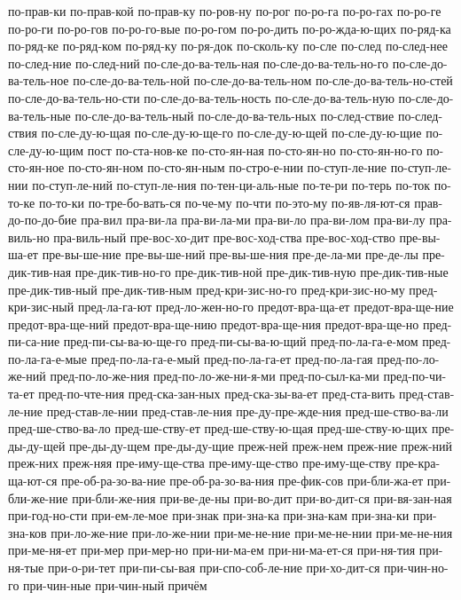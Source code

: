 {по-прав-ки
по-прав-кой
по-прав-ку
по-ров-ну
по-рог
по-ро-га
по-ро-гах
по-ро-ге
по-ро-ги
по-ро-гов
по-ро-го-вые
по-ро-гом
по-ро-дить
по-ро-жда-ю-щих
по-ряд-ка
по-ряд-ке
по-ряд-ком
по-ряд-ку
по-ря-док
по-сколь-ку
по-сле
по-след
по-след-нее
по-след-ние
по-след-ний
по-сле-до-ва-тель-ная
по-сле-до-ва-тель-но-го
по-сле-до-ва-тель-ное
по-сле-до-ва-тель-ной
по-сле-до-ва-тель-ном
по-сле-до-ва-тель-но-стей
по-сле-до-ва-тель-но-сти
по-сле-до-ва-тель-ность
по-сле-до-ва-тель-ную
по-сле-до-ва-тель-ные
по-сле-до-ва-тель-ный
по-сле-до-ва-тель-ных
по-след-ствие
по-след-ствия
по-сле-ду-ю-щая
по-сле-ду-ю-ще-го
по-сле-ду-ю-щей
по-сле-ду-ю-щие
по-сле-ду-ю-щим
пост
по-ста-нов-ке
по-сто-ян-ная
по-сто-ян-но
по-сто-ян-но-го
по-сто-ян-ное
по-сто-ян-ном
по-сто-ян-ным
по-стро-е-нии
по-ступ-ле-ние
по-ступ-ле-нии
по-ступ-ле-ний
по-ступ-ле-ния
по-тен-ци-аль-ные
по-те-ри
по-терь
по-ток
по-то-ке
по-то-ки
по-тре-бо-вать-ся
по-че-му
по-чти
по-это-му
по-яв-ля-ют-ся
прав-до-по-до-бие
пра-вил
пра-ви-ла
пра-ви-ла-ми
пра-ви-ло
пра-ви-лом
пра-ви-лу
пра-виль-но
пра-виль-ный
пре-вос-хо-дит
пре-вос-ход-ства
пре-вос-ход-ство
пре-вы-ша-ет
пре-вы-ше-ние
пре-вы-ше-ний
пре-вы-ше-ния
пре-де-ла-ми
пре-де-лы
пре-дик-тив-ная
пре-дик-тив-но-го
пре-дик-тив-ной
пре-дик-тив-ную
пре-дик-тив-ные
пре-дик-тив-ный
пре-дик-тив-ным
пред-кри-зис-но-го
пред-кри-зис-но-му
пред-кри-зис-ный
пред-ла-га-ют
пред-ло-жен-но-го
предот-вра-ща-ет
предот-вра-ще-ние
предот-вра-ще-ний
предот-вра-ще-нию
предот-вра-ще-ния
предот-вра-ще-но
пред-пи-са-ние
пред-пи-сы-ва-ю-ще-го
пред-пи-сы-ва-ю-щий
пред-по-ла-га-е-мом
пред-по-ла-га-е-мые
пред-по-ла-га-е-мый
пред-по-ла-га-ет
пред-по-ла-гая
пред-по-ло-же-ний
пред-по-ло-же-ния
пред-по-ло-же-ни-я-ми
пред-по-сыл-ка-ми
пред-по-чи-та-ет
пред-по-чте-ния
пред-ска-зан-ных
пред-ска-зы-ва-ет
пред-ста-вить
пред-став-ле-ние
пред-став-ле-нии
пред-став-ле-ния
пре-ду-пре-жде-ния
пред-ше-ство-ва-ли
пред-ше-ство-ва-ло
пред-ше-ству-ет
пред-ше-ству-ю-щая
пред-ше-ству-ю-щих
пре-ды-ду-щей
пре-ды-ду-щем
пре-ды-ду-щие
преж-ней
преж-нем
преж-ние
преж-ний
преж-них
преж-няя
пре-иму-ще-ства
пре-иму-ще-ство
пре-иму-ще-ству
пре-кра-ща-ют-ся
пре-об-ра-зо-ва-ние
пре-об-ра-зо-ва-ния
пре-фик-сов
при-бли-жа-ет
при-бли-же-ние
при-бли-же-ния
при-ве-де-ны
при-во-дит
при-во-дит-ся
при-вя-зан-ная
при-год-но-сти
при-ем-ле-мое
при-знак
при-зна-ка
при-зна-кам
при-зна-ки
при-зна-ков
при-ло-же-ние
при-ло-же-нии
при-ме-не-ние
при-ме-не-нии
при-ме-не-ния
при-ме-ня-ет
при-мер
при-мер-но
при-ни-ма-ем
при-ни-ма-ет-ся
при-ня-тия
при-ня-тые
при-о-ри-тет
при-пи-сы-вая
при-спо-соб-ле-ние
при-хо-дит-ся
при-чин-но-го
при-чин-ные
при-чин-ный
причём
}
